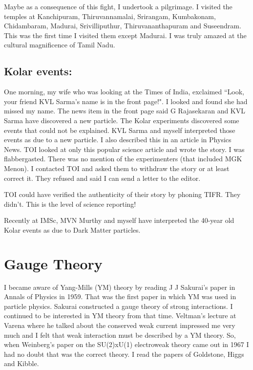 Maybe as a consequence of this fight, I undertook a pilgrimage. I 
visited the temples at Kanchipuram, Thiruvannamalai, Srirangam, 
Kumbakonam, Chidambaram, Madurai, Srivilliputhur, Thiruvananthapuram and 
Suseendram. This was the first time I visited them except Madurai. I was 
truly amazed at the cultural magnificence of Tamil Nadu.

\subsection*{Kolar events: }

One morning, my wife who was looking at the Times of India, exclaimed 
``Look, your friend KVL Sarma's name is in the front page!". I looked and 
found she had missed my name. The news item in the front page said G 
Rajasekaran and KVL Sarma have discovered a new particle. The Kolar 
experiments discovered some events that could not be explained. KVL 
Sarma and myself interpreted those events as due to a new particle. I 
also described this in an article in Physics News. TOI looked at only 
this popular science article and wrote the story. I was flabbergasted. 
There was no mention of the experimenters (that included MGK Menon). I 
contacted TOI and asked them to withdraw the story or at least correct 
it. They refused and said I can send a letter to the editor.
\vskip 5pt

TOI could have verified the authenticity of their story by phoning TIFR. 
They didn't. This is the level of science reporting!
\medskip

Recently at IMSc, MVN Murthy and myself have interpreted the 40-year old 
Kolar events as due to Dark Matter particles.

\section*{Gauge Theory}

I became aware of Yang-Mills (YM) theory by reading J J Sakurai's paper 
in Annals of Physics in 1959. That was the first paper in which YM was 
used in particle physics. Sakurai constructed a gauge theory of strong 
interactions. I continued to be interested in YM theory from that time. 
Veltman's lecture at Varena where he talked about the conserved weak 
current impressed me very much and I felt that weak interaction must be 
described by a YM theory. So, when Weinberg's paper on the SU(2)xU(1) 
electroweak theory came out in 1967 I had no doubt that was the correct 
theory. I read the papers of Goldstone, Higgs and Kibble.

